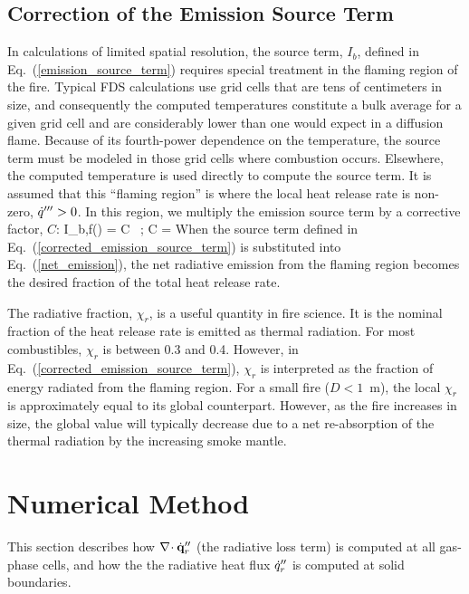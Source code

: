 \subsection{Correction of the Emission Source Term}

In calculations of limited spatial resolution, the source term, $I_b$,
defined in Eq.~(\ref{emission_source_term}) requires special treatment in the flaming region of the fire. Typical FDS calculations
use grid cells that are tens of centimeters in size, and consequently the computed temperatures constitute a bulk average for a given grid cell and are considerably lower than
one would expect in a diffusion flame.
Because of its fourth-power dependence on the temperature,
the source term must be modeled in those grid cells where combustion occurs. Elsewhere, the computed temperature is used directly to compute the source term.
It is assumed that this ``flaming region'' is where the local heat release rate is non-zero, $\dot{q}'''>0$. In this region, we
multiply the emission source term by a corrective factor, $C$:
\be I_{b,f}(\bx) = C \,    \quad ; \quad
    C =  \label{corrected_emission_source_term}
\ee
When the source term defined in Eq.~(\ref{corrected_emission_source_term}) is
substituted into Eq.~(\ref{net_emission}), the net radiative emission from the flaming region becomes the desired fraction of the total heat release rate.

The radiative
fraction, $\chi_r$, is a useful quantity in fire science. It is the nominal fraction of the heat release rate is emitted as thermal radiation. For most combustibles, $\chi_r$
is between 0.3 and 0.4. However, in Eq.~(\ref{corrected_emission_source_term}), $\chi_r$ is
interpreted as the fraction of energy radiated from the flaming
region.  For a small fire ($D<1$~m), the local $\chi_r$ is
approximately equal to its global counterpart. However, as the fire
increases in size, the global value will typically decrease due to a
net re-absorption of the thermal radiation by the increasing smoke
mantle.


\section{Numerical Method}
\label{radnumericalmethodsection}

This section describes how $\nabla\!\cdot \dot{\bf q}_r''$ (the radiative loss
term) is computed at all gas-phase cells, and how the
the radiative heat flux $\dot{q}_r''$ is computed at solid boundaries.

